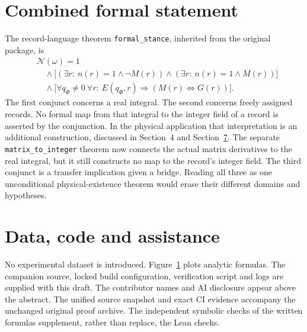 \documentclass[11pt]{article}
\theoremstyle{definition}\newtheorem{definition}[theorem]{Definition}
\theoremstyle{remark}\newtheorem{remark}[theorem]{Remark}
\begin{document}
\section{Combined formal statement}
The record-language theorem \texttt{formal\_stance}, inherited from the original package, is
\begin{align*}
 &\mathcal N(\omega)=1\\[-0.3em]
 &\quad\land\bigl[(\exists r:\ n(r)=1\land\neg M(r))
       \land(\exists r:\ n(r)=1\land M(r))\bigr]\\[-0.3em]
 &\quad\land\bigl[\forall q_\Phi\neq0\ \forall r:\
 E(q_\Phi,r)\Rightarrow(M(r)\Longleftrightarrow G(r))\bigr].
\end{align*}
The first conjunct concerns a real integral. The second concerns freely assigned records. No formal map from that integral to the integer field of a record is asserted by the conjunction. In the physical application that interpretation is an additional construction, discussed in Section~4 and Section~\hyperref[sec:physical]{7}. The separate \texttt{matrix\_to\_integer} theorem now connects the actual matrix derivatives to the real integral, but it still constructs no map to the record's integer field. The third conjunct is a transfer implication given a bridge. Reading all three as one unconditional physical-existence theorem would erase their different domains and hypotheses.

\section*{Data, code and assistance}
No experimental dataset is introduced. Figure~\hyperref[fig:curvature]{1} plots analytic formulas. The companion source, locked build configuration, verification script and logs are supplied with this draft. The contributor names and AI disclosure appear above the abstract. The unified source snapshot and exact CI evidence accompany the unchanged original proof archive. The independent symbolic checks of the written formulas supplement, rather than replace, the Lean checks.
\end{document}
